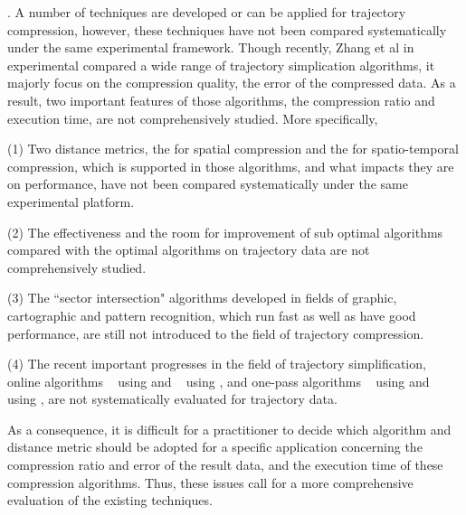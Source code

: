 . A number of techniques are developed or can be applied for trajectory compression, however, these techniques have not been compared systematically under the same experimental framework.
Though recently, Zhang et al in \cite{Zhang:Evaluation} experimental compared a wide range of trajectory simplication algorithms, it majorly focus on the compression quality, \ie the error of the compressed data. As a result, two important features of those algorithms, the compression ratio and execution time, are not comprehensively studied. 
More specifically, 

\ni (1) Two distance metrics, \ie the \ped for spatial compression and the \sed \cite{Meratnia:Spatiotemporal} for spatio-temporal compression, which is supported in those algorithms, and what impacts they are on performance, have not been compared systematically under the same experimental platform. 

\ni (2) The effectiveness and the room for improvement of sub optimal \lsa algorithms compared with the optimal \lsa algorithms on trajectory data are not comprehensively studied.

\ni (3) The ``sector intersection" algorithms \cite{Williams:Longest, Sklansky:Cone, Dunham:Cone, Zhao:Sleeve} developed in fields of graphic, cartographic and pattern recognition, which run fast as well as have good performance, are still not introduced to the field of trajectory compression.

\ni (4) The recent important progresses in the field of trajectory simplification, \ie online algorithms \squishe~\cite{Muckell:Compression} using \sed and \bqsa~\cite{Liu:BQS} using \ped, and one-pass algorithms \operb~\cite{Lin:Operb} using \ped and \cised~\cite{Lin:Cised} using \sed, are not systematically evaluated for trajectory data. 


As a consequence, it is difficult for a practitioner to decide which algorithm and distance metric should be adopted for a specific application concerning the compression ratio and error of the result data, and the execution time of these compression algorithms.
% 
Thus, these issues call for a more comprehensive evaluation of the existing \lsa techniques. %


